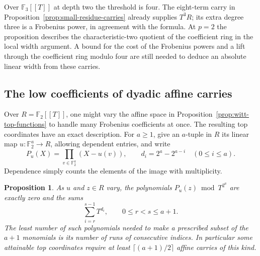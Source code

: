 \documentclass[11pt,letterpaper]{article}
\newtheorem{proposition}[proposition]{Proposition}
\theoremstyle{definition}
\numberwithin{equation}{section}
\begin{document}
Over $\mathbb F_3[[T]]$ at depth two the threshold is four. The
eight-term carry in Proposition~\ref{prop:small-residue-carries}
already supplies $T^3R$; its extra degree three is a Frobenius
power, in agreement with the formula. At $p=2$ the proposition
describes the characteristic-two quotient of the coefficient ring
in the local width argument. A bound for the cost of the Frobenius
powers and a lift through the coefficient ring modulo four are
still needed to deduce an absolute linear width from these carries.

\subsection{The low coefficients of dyadic affine carries}
\label{sec:witt-affine-intervals}
Over $R=\mathbb F_2[[T]]$, one might vary the affine space in
Proposition~\ref{prop:witt-top-functions} to handle many Frobenius
coefficients at once. The resulting top coordinates have an exact
description. For $a\ge1$, give an $a$-tuple in $R$ its linear map
$u:\mathbb F_2^a\to R$, allowing dependent entries, and write
\[
 P_u(X)=\prod_{v\in\mathbb F_2^a}(X-u(v)),\qquad
 d_i=2^a-2^{a-i}\quad(0\le i\le a).
\]
Dependence simply counts the elements of the image with multiplicity.
\begin{proposition}\label{prop:witt-affine-intervals}
As $u$ and $z\in R$ vary, the polynomials $P_u(z)\bmod T^{2^a}$
are exactly zero and the sums
\[
                       \sum_{i=r}^{s-1} T^{d_i},
                 \qquad 0\le r<s\le a+1 .
\]
The least number of such polynomials needed to make a prescribed
subset of the $a+1$ monomials is its number of runs of consecutive
indices. In particular some attainable top coordinates require at
least $\lceil(a+1)/2\rceil$ affine carries of this kind.
\end{proposition}
\end{document}
